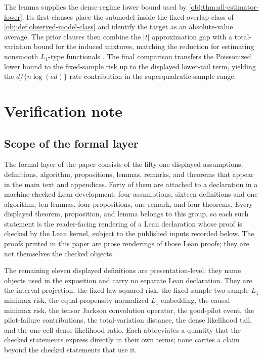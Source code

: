 \documentclass[11pt]{article}
\begin{document}
The lemma supplies the dense-regime lower bound used by \cref{obj:thm:all-estimator-lower}. Its first clauses place the submodel inside the fixed-overlap class of \cref{obj:def:observed-model-class} and identify the target as an absolute-value average. The prior clauses then combine the \(|t|\) approximation gap with a total-variation bound for the induced mixtures, matching the reduction for estimating nonsmooth \(L_1\)-type functionals \citep{CaiLow2011L1,JiaoHanWeissman2018L1}. The final comparison transfers the Poissonized lower bound to the fixed-sample risk up to the displayed lower-tail term, yielding the \(d/\{n\log(ed)\}\) rate contribution in the superquadratic-sample range.


\section{Verification note}

\subsection*{Scope of the formal layer}

The formal layer of the paper consists of the fifty-one displayed assumptions, definitions, algorithm, propositions, lemmas, remarks, and theorems that appear in the main text and appendices. Forty of them are attached to a declaration in a machine-checked Lean development: four assumptions, sixteen definitions and one algorithm, ten lemmas, four propositions, one remark, and four theorems. Every displayed theorem, proposition, and lemma belongs to this group, so each such statement is the reader-facing rendering of a Lean declaration whose proof is checked by the Lean kernel, subject to the published inputs recorded below. The proofs printed in this paper are prose renderings of those Lean proofs; they are not themselves the checked objects.

The remaining eleven displayed definitions are presentation-level: they name objects used in the exposition and carry no separate Lean declaration. They are the interval projection, the fixed-law squared risk, the fixed-sample two-sample \(L_1\) minimax risk, the equal-propensity normalized \(L_1\) embedding, the causal minimax risk, the tensor Jackson convolution operator, the good-pilot event, the pilot-failure contributions, the total-variation distance, the dense likelihood tail, and the one-cell dense likelihood ratio. Each abbreviates a quantity that the checked statements express directly in their own terms; none carries a claim beyond the checked statements that use it.
\end{document}
